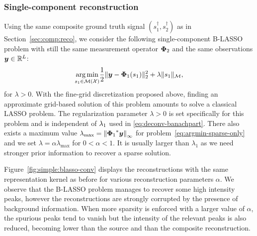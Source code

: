         \subsubsection{Single-component reconstruction}
        Using the same composite ground truth signal $(s_1^\dagger, s_2^\dagger)$ as in Section~\ref{sec:comp:reco}, we consider the following single-component B-LASSO problem with still the same measurement operator ${\bm{\Phi}_2}$ and the same observations $\bm{y}\in\mathbb{R}^L$:
        \begin{equation}
            \label{eq:argmin-sparse-only}
            \underset{s_1 \in {\mathcal{M}}({\mathcal{X}})}{\arg\min} \frac{1}{2} \| \bm{y} - {\bm{\Phi}_1} (s_1) \|_2^2  + \lambda \| s_1 \|_{\mathcal{M}},
        \end{equation}
        for $\lambda > 0$.
        With the fine-grid discretization proposed above, finding an approximate grid-based solution of this problem amounts to solve a classical LASSO problem. The regularization parameter $\lambda > 0$ is set specifically for this problem and is independent of $\lambda_{1}$ used in \eqref{eq:deconv-banachpart}. There also exists a maximum value $\lambda_\mathrm{max} = \left\lVert{\bm{\Phi}_1}^*\bm{y}\right\rVert_\infty$ for problem~\eqref{eq:argmin-sparse-only} and we set $\lambda = \alpha \lambda_\mathrm{max}$ for $0 < \alpha < 1$. It is usually larger than $\lambda_1$ as we need stronger prior information to recover a sparse solution.
        
        Figure~\ref{fig:simple:blasso-conv} displays the reconstructions with the same representation kernel as before for various reconstruction parameters $\alpha$.
        We observe that the B-LASSO problem manages to recover some high intensity peaks, however the reconstructions are strongly corrupted by the presence of background information. When more sparsity is enforced with a larger value of $\alpha$, the spurious peaks tend to vanish but the intensity of the relevant peaks is also reduced, becoming lower than the source and than the composite reconstruction.

